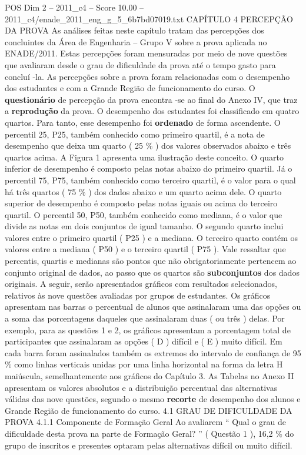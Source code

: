 \begin{textsample}{POS Dim 2 – 2011\_c4 – Score 10.00 – 2011\_c4/enade\_2011\_eng\_g\_5\_6b7bd07019.txt}  \label{ex:f2_pos_122}
CAPÍTULO 4 PERCEPÇÃO DA PROVA As análises feitas neste capítulo tratam das percepções dos concluintes da Área de Engenharia – Grupo V sobre a prova aplicada no ENADE/2011.
Estas percepções foram mensuradas por meio de nove questões que avaliaram desde o grau de dificuldade da prova até o tempo gasto para concluí -la.
As percepções sobre a prova foram relacionadas com o desempenho dos estudantes e com a Grande Região de funcionamento do curso.
O \textbf{questionário} de percepção da prova encontra -se ao final do Anexo IV, que traz a \textbf{reprodução} da prova.
O desempenho dos estudantes foi classificado em quatro quartos.
Para tanto, esse desempenho foi \textbf{ordenado} de forma ascendente.
O percentil 25, P25, também conhecido como primeiro quartil, é a nota de desempenho que deixa um quarto ( 25 \% ) dos valores observados abaixo e três quartos acima.
A Figura 1 apresenta uma ilustração deste conceito.
O quarto inferior de desempenho é composto pelas notas abaixo do primeiro quartil.
Já o percentil 75, P75, também conhecido como terceiro quartil, é o valor para o qual há três quartos ( 75 \% ) dos dados abaixo e um quarto acima dele.
O quarto superior de desempenho é composto pelas notas iguais ou acima do terceiro quartil.
O percentil 50, P50, também conhecido como mediana, é o valor que divide as notas em dois conjuntos de igual tamanho.
O segundo quarto inclui valores entre o primeiro quartil ( P25 ) e a mediana.
O terceiro quarto contém os valores entre a mediana ( P50 ) e o terceiro quartil ( P75 ).
Vale ressaltar que percentis, quartis e medianas são pontos que não obrigatoriamente pertencem ao conjunto original de dados, ao passo que os quartos são \textbf{subconjuntos} dos dados originais.
A seguir, serão apresentados gráficos com resultados selecionados, relativos às nove questões avaliadas por grupos de estudantes.
Os gráficos apresentam nas barras o percentual de alunos que assinalaram uma das opções ou a soma das porcentagens daqueles que assinalaram duas ( ou três ) delas.
Por exemplo, para as questões 1 e 2, os gráficos apresentam a porcentagem total de participantes que assinalaram as opções ( D ) difícil e ( E ) muito difícil.
Em cada barra foram assinalados também os extremos do intervalo de confiança de 95 \% como linhas verticais unidas por uma linha horizontal na forma da letra H maiúscula, semelhantemente aos gráficos do Capítulo 3.
As Tabelas no Anexo II apresentam os valores absolutos e a distribuição percentual das alternativas válidas das nove questões, segundo o mesmo \textbf{recorte} de desempenho dos alunos e Grande Região de funcionamento do curso. 4.1 GRAU DE DIFICULDADE DA PROVA 4.1.1 Componente de Formação Geral Ao avaliarem “ Qual o grau de dificuldade desta prova na parte de Formação Geral? ” ( Questão 1 ), 16,2 \% do grupo de inscritos e presentes optaram pelas alternativas difícil ou muito difícil.

\end{textsample}
